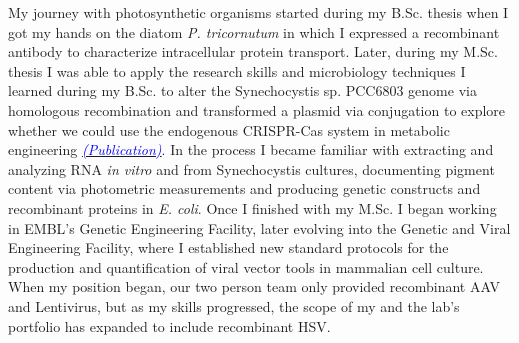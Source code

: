 \documentclass[11pt,a4paper,sans]{moderncv}
\begin{document}
\begin{spacing}{1.15}
My journey with photosynthetic organisms started during my B.Sc. thesis when I got my hands on the diatom \textit{P. tricornutum} in which I expressed a recombinant antibody to characterize intracellular protein transport. 
Later, during my M.Sc. thesis I was able to apply the research skills and microbiology techniques I learned during my B.Sc. to alter the Synechocystis sp. PCC6803 genome via homologous recombination and transformed a plasmid via conjugation to explore whether we could use the endogenous CRISPR-Cas system in metabolic engineering {\href{https://www.ncbi.nlm.nih.gov/pubmed/29517395}{\textcolor{blue}{{\textit{(Publication)}}}}}. 
In the process I became familiar with extracting and analyzing RNA \textit{in vitro} and from Synechocystis cultures, documenting pigment content via photometric measurements and producing genetic constructs and recombinant proteins in \textit{E. coli}. 
Once I finished with my M.Sc. I began working in EMBL's Genetic Engineering Facility, later evolving into the Genetic and Viral Engineering Facility, where I established new standard protocols for the production and quantification of viral vector tools in mammalian cell culture. 
When my position began, our two person team only provided recombinant AAV and Lentivirus, but as my skills progressed, the scope of my and the lab's portfolio has expanded to include recombinant HSV.\par


\end{spacing}
\end{document}
